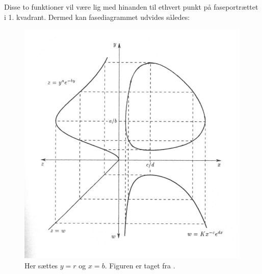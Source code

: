 Disse to funktioner vil være lig med hinanden til ethvert punkt på faseportrættet i 1. kvadrant. Dermed kan fasediagrammet udvides således:\\
\begin{figure} [H]
    \centering
    \includegraphics[scale=0.8]{Images/fasediagramteori.png}
    \caption{Her sættes $y=r$ og $x=b$. Figuren er taget fra \citep[s. 25]{Svensk}.}
    \label{svensk}
\end{figure}



